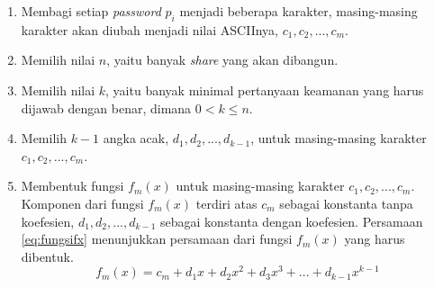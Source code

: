 \begin{enumerate}
	\item Membagi setiap \textit{password} \begin{math}p_i\end{math} menjadi beberapa karakter, masing-masing karakter akan diubah menjadi nilai ASCIInya, \begin{math}c_1, c_2, ..., c_m\end{math}.
		\item Memilih nilai \begin{math}n\end{math}, yaitu banyak \textit{share} yang akan dibangun.
	\item Memilih nilai \begin{math}k\end{math}, yaitu banyak minimal pertanyaan keamanan yang harus dijawab dengan benar, dimana \begin{math}0 < k \leq n\end{math}.
	\item Memilih \begin{math}k-1\end{math} angka acak, \begin{math}d_1, d_2, ..., d_{k-1}\end{math}, untuk masing-masing karakter \begin{math}c_1, c_2, ..., c_m\end{math}.
	\item Membentuk fungsi \begin{math}f_m(x)\end{math} untuk masing-masing karakter \begin{math}c_1, c_2, ..., c_m\end{math}. 
	Komponen dari fungsi \begin{math}f_m(x)\end{math} terdiri atas \begin{math}c_m\end{math} sebagai konstanta tanpa koefesien, \begin{math}d_1, d_2, ..., d_{k-1}\end{math} sebagai konstanta dengan koefesien. Persamaan \ref{eq:fungsifx} menunjukkan persamaan dari fungsi \begin{math}f_m(x)\end{math} yang harus dibentuk.
	\begin{equation}
		f_m(x) = c_m + d_1x + d_2x^2 + d_3x^3 + ... + d_{k-1}x^{k-1}
		\label{eq:fungsifx}
	\end{equation}

\end{enumerate}
